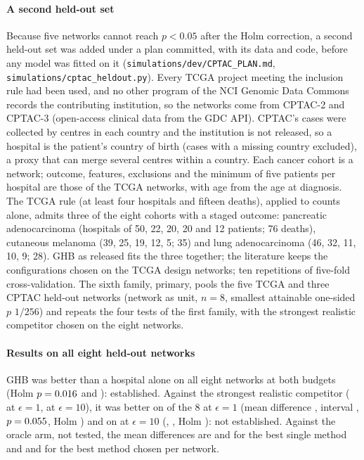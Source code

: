 \documentclass[acmsmall,screen,nonacm]{acmart}
\theoremstyle{acmdefinition}
\begin{document}
\paragraph{A second held-out set}\label{sec:s-cptac} Because five networks cannot reach $p<0.05$ after the Holm correction, a second held-out set was added under a plan committed, with its data and code, before any model was fitted on it (\texttt{simulations/dev/CPTAC\_PLAN.md}, \texttt{simulations/cptac\_heldout.py}). Every TCGA project meeting the inclusion rule had been used, and no other program of the NCI Genomic Data Commons records the contributing institution, so the networks come from CPTAC-2 and CPTAC-3 \cite{edwards2015cptac} (open-access clinical data from the GDC API). CPTAC's cases were collected by centres in each country and the institution is not released, so a hospital is the patient's country of birth (cases with a missing country excluded), a proxy that can merge several centres within a country. Each cancer cohort is a network; outcome, features, exclusions and the minimum of five patients per hospital are those of the TCGA networks, with age from the age at diagnosis. The TCGA rule (at least four hospitals and fifteen deaths), applied to counts alone, admits three of the eight cohorts with a staged outcome: pancreatic adenocarcinoma (hospitals of 50, 22, 20, 20 and 12 patients; 76 deaths), cutaneous melanoma (39, 25, 19, 12, 5; 35) and lung adenocarcinoma (46, 32, 11, 10, 9; 28). GHB as released fits the three together; the literature keeps the configurations chosen on the TCGA design networks; ten repetitions of five-fold cross-validation. The sixth family, primary, pools the five TCGA and three CPTAC held-out networks (network as unit, $n=8$, smallest attainable one-sided $p$ $1/256$) and repeats the four tests of the first family, with the strongest realistic competitor chosen on the eight networks.

\paragraph{Results on all eight held-out networks} GHB was better than a hospital alone on all eight networks at both budgets (Holm $p=0.016$ and \SimStHTenLocHolm): established. Against the strongest realistic competitor (\SimStHOneRealName{} at $\epsilon=1$, \SimStHTenRealName{} at $\epsilon=10$), it was better on \SimStHOneRealWins{} of the 8 at $\epsilon=1$ (mean difference \SimStHOneRealMean, interval \SimStHOneRealCI, $p=0.055$, Holm \SimStHOneRealHolm) and on \SimStHTenRealWins{} at $\epsilon=10$ (\SimStHTenRealMean, \SimStHTenRealCI, Holm \SimStHTenRealHolm): not established. Against the oracle arm, not tested, the mean differences are \SimStHOneOrcMean{} and \SimStHTenOrcMean{} for the best single method and \SimStHOneNetMean{} and \SimStHTenNetMean{} for the best method chosen per network.
\end{document}
